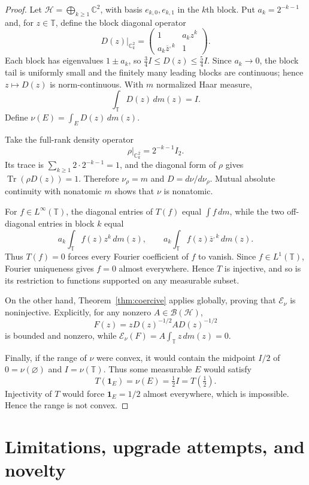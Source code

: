 \documentclass[11pt]{article}
\newcommand{\B}{\mathcal B}
\newcommand{\E}{\mathcal E}
\newcommand{\T}{\mathbb T}
\newcommand{\Tr}{\operatorname{Tr}}
\begin{document}
\begin{proof}
Let
$\mathcal H=\bigoplus_{k\ge1}\mathbb C^2$, with basis
$e_{k,0},e_{k,1}$ in the $k$th block.  Put $a_k=2^{-k-1}$ and, for
$z\in\T$, define the block diagonal operator
\[
 D(z)|_{\mathbb C^2_k}=
 \begin{pmatrix}
 1&a_k z^k\\
 a_k\overline z^{,k}&1
 \end{pmatrix}.
\]
Each block has eigenvalues $1\pm a_k$, so
$\frac34I\le D(z)\le\frac54I$.  Since $a_k\to0$, the block tail is
uniformly small and the finitely many leading blocks are continuous; hence
$z\mapsto D(z)$ is norm-continuous.  With $m$ normalized Haar measure,
\[
 \int_\T D(z)\,dm(z)=I.
\]
Define $\nu(E)=\int_E D(z)\,dm(z)$.

Take the full-rank density operator
\[
 \rho|_{\mathbb C^2_k}=2^{-k-1}I_2.
\]
Its trace is $\sum_{k\ge1}2\cdot2^{-k-1}=1$, and the diagonal form of
$\rho$ gives $\Tr(\rho D(z))=1$.  Therefore $\nu_\rho=m$ and
$D=d\nu/d\nu_\rho$.  Mutual absolute continuity with nonatomic $m$ shows
that $\nu$ is nonatomic.

For $f\in L^\infty(\T)$, the diagonal entries of $T(f)$ equal
$\int f\,dm$, while the two off-diagonal entries in block $k$ equal
\[
 a_k\int_\T f(z)z^k\,dm(z),
 \qquad
 a_k\int_\T f(z)\overline z^{,k}\,dm(z).
\]
Thus $T(f)=0$ forces every Fourier coefficient of $f$ to vanish.  Since
$f\in L^1(\T)$, Fourier uniqueness gives $f=0$ almost everywhere.  Hence
$T$ is injective, and so is its restriction to functions supported on any
measurable subset.

On the other hand, Theorem~\ref{thm:coercive} applies globally, proving that
$\E_\nu$ is noninjective.  Explicitly, for any nonzero $A\in\B(\mathcal H)$,
\[
 F(z)=zD(z)^{-1/2}AD(z)^{-1/2}
\]
is bounded and nonzero, while $\E_\nu(F)=A\int_\T z\,dm(z)=0$.

Finally, if the range of $\nu$ were convex, it would contain the midpoint
$I/2$ of $0=\nu(\varnothing)$ and $I=\nu(\T)$.  Thus some measurable $E$
would satisfy
\[
 T(\mathbf1_E)=\nu(E)=\tfrac12I=T(\tfrac12).
\]
Injectivity of $T$ would force $\mathbf1_E=1/2$ almost everywhere, which is
impossible.  Hence the range is not convex.
\end{proof}

\section{Limitations, upgrade attempts, and novelty}
\end{document}

